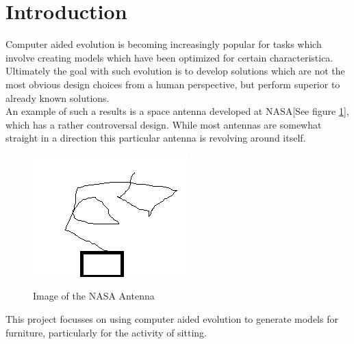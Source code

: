 \section{Introduction}
Computer aided evolution is becoming increasingly popular for tasks which involve creating models which have been optimized for certain characteristica.
Ultimately the goal with such evolution is to develop solutions which are not the most obvious design choices from a human perspective, but perform superior to already known solutions.\\

An example of such a results is a space antenna developed at NASA[See figure \ref{fig:nasa_antenna}], which has a rather controversal design. While most antennas are somewhat straight in a direction this particular antenna is revolving around itself.

\begin{figure}[ht]
\includegraphics[scale=1]{content/img/space_antenna}
\label{fig:nasa_antenna}\\
\caption{Image of the NASA Antenna \cite{paper:ev1} }
\end{figure}

This project focusses on using computer aided evolution to generate models for furniture, particularly for the activity of sitting.